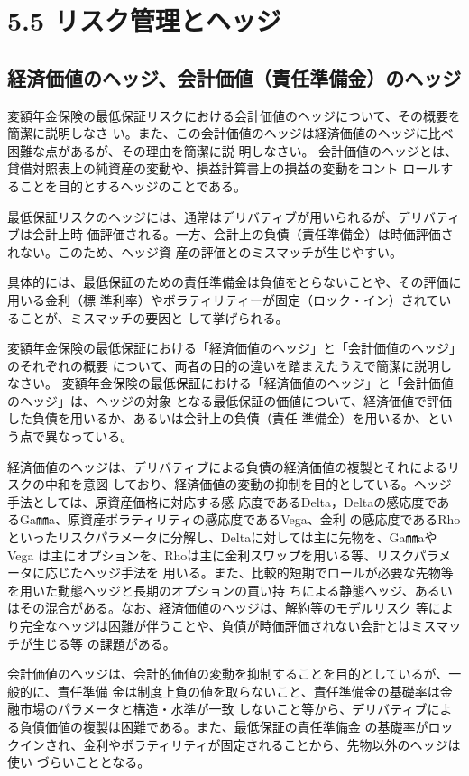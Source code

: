 \documentclass[report,gutter=10mm,fore-edge=10mm,uplatex,dvipdfmx]{jlreq}
\begin{document}
{\section{5.5 リスク管理とヘッジ}
\subsection{経済価値のヘッジ、会計価値（責任準備金）のヘッジ}
変額年金保険の最低保証リスクにおける会計価値のヘッジについて、その概要を簡潔に説明しなさ
い。また、この会計価値のヘッジは経済価値のヘッジに比べ困難な点があるが、その理由を簡潔に説
明しなさい。
\answer{}
会計価値のヘッジとは、貸借対照表上の純資産の変動や、損益計算書上の損益の変動をコント
ロールすることを目的とするヘッジのことである。

最低保証リスクのヘッジには、通常はデリバティブが用いられるが、デリバティブは会計上時
価評価される。一方、会計上の負債（責任準備金）は時価評価されない。このため、ヘッジ資
産の評価とのミスマッチが生じやすい。

具体的には、最低保証のための責任準備金は負値をとらないことや、その評価に用いる金利（標
準利率）やボラティリティーが固定（ロック・イン）されていることが、ミスマッチの要因と
して挙げられる。

変額年金保険の最低保証における「経済価値のヘッジ」と「会計価値のヘッジ」のそれぞれの概要
について、両者の目的の違いを踏まえたうえで簡潔に説明しなさい。
\answer{}
変額年金保険の最低保証における「経済価値のヘッジ」と「会計価値のヘッジ」は、ヘッジの対象
となる最低保証の価値について、経済価値で評価した負債を用いるか、あるいは会計上の負債（責任
準備金）を用いるか、という点で異なっている。

経済価値のヘッジは、デリバティブによる負債の経済価値の複製とそれによるリスクの中和を意図
しており、経済価値の変動の抑制を目的としている。ヘッジ手法としては、原資産価格に対応する感
応度であるDelta，Deltaの感応度であるGa㎜a、原資産ボラティリティの感応度であるVega、金利
の感応度であるRhoといったリスクパラメータに分解し、Deltaに対しては主に先物を、Ga㎜aやVega
は主にオプションを、Rhoは主に金利スワップを用いる等、リスクパラメータに応じたヘッジ手法を
用いる。また、比較的短期でロールが必要な先物等を用いた動態ヘッジと長期のオプションの買い持
ちによる静態ヘッジ、あるいはその混合がある。なお、経済価値のヘッジは、解約等のモデルリスク
等により完全なヘッジは困難が伴うことや、負債が時価評価されない会計とはミスマッチが生じる等
の課題がある。

会計価値のヘッジは、会計的価値の変動を抑制することを目的としているが、一般的に、責任準備
金は制度上負の値を取らないこと、責任準備金の基礎率は金融市場のパラメータと構造・水準が一致
しないこと等から、デリバティブによる負債価値の複製は困難である。また、最低保証の責任準備金
の基礎率がロックインされ、金利やボラティリティが固定されることから、先物以外のヘッジは使い
づらいこととなる。

}
\end{document}
